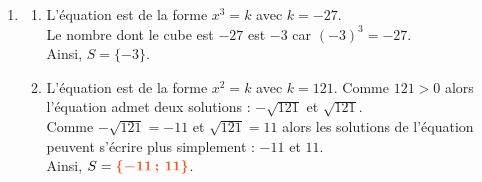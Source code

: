 \documentclass[a4paper,11pt]{article}
\begin{document}
\begin{seanceD}{}
\begin{enumerate}
\item \begin{enumerate}[itemsep=1em]
	\item L'équation est de la forme $x^3=k$ avec $k=-27$. \\
              Le nombre dont le cube est $-27$ est $-3$ car $(-3)^3=-27$.\\
              Ainsi,   $S=\{-3\}$.
              
	\item L'équation est de la forme $x^2=k$ avec $k=121$. Comme  $121>0$ alors l'équation admet deux solutions : $-\sqrt{121}$ et $\sqrt{121}$.\\
                Comme $-\sqrt{121}=-11$ et $\sqrt{121}=11$ alors
                les solutions de l'équation peuvent s'écrire plus simplement : $-11$ et $11$.\\
                Ainsi,  $S={\color[HTML]{f15929}\boldsymbol{\{-11\,;\,11\}}}$.
\end{enumerate}

\end{enumerate}

\end{seanceD}
\end{document}
